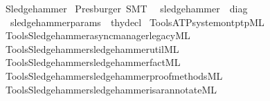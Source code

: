 %
\begin{isabellebody}%
%
%
\isadelimdocument
%
\endisadelimdocument
%
\isatagdocument
%
\isamarkuptrue%
%
\endisatagdocument
{\isafolddocument}%
%
\isadelimdocument
%
\endisadelimdocument
%
\isadelimtheory
%
\endisadelimtheory
%
\isatagtheory
{}\isamarkupfalse%
\ Sledgehammer\isanewline
{}\ Presburger\ SMT\isanewline
{}\isanewline
\ \ {\isachardoublequoteopen}sledgehammer{\isachardoublequoteclose}\ {\isacharcolon}{\kern0pt}{\isacharcolon}{\kern0pt}\ diag\ \isanewline
\ \ {\isachardoublequoteopen}sledgehammer{\isacharunderscore}{\kern0pt}params{\isachardoublequoteclose}\ {\isacharcolon}{\kern0pt}{\isacharcolon}{\kern0pt}\ thy{\isacharunderscore}{\kern0pt}decl\isanewline
{}%
\endisatagtheory
{\isafoldtheory}%
%
\isadelimtheory
\isanewline
%
\endisadelimtheory
%
\isadelimML
\isanewline
%
\endisadelimML
%
\isatagML
{}\isamarkupfalse%
\ {\isacartoucheopen}Tools{\isacharslash}{\kern0pt}ATP{\isacharslash}{\kern0pt}system{\isacharunderscore}{\kern0pt}on{\isacharunderscore}{\kern0pt}tptp{\isachardot}{\kern0pt}ML{\isacartoucheclose}\isanewline
{}\isamarkupfalse%
\ {\isacartoucheopen}Tools{\isacharslash}{\kern0pt}Sledgehammer{\isacharslash}{\kern0pt}async{\isacharunderscore}{\kern0pt}manager{\isacharunderscore}{\kern0pt}legacy{\isachardot}{\kern0pt}ML{\isacartoucheclose}\isanewline
{}\isamarkupfalse%
\ {\isacartoucheopen}Tools{\isacharslash}{\kern0pt}Sledgehammer{\isacharslash}{\kern0pt}sledgehammer{\isacharunderscore}{\kern0pt}util{\isachardot}{\kern0pt}ML{\isacartoucheclose}\isanewline
{}\isamarkupfalse%
\ {\isacartoucheopen}Tools{\isacharslash}{\kern0pt}Sledgehammer{\isacharslash}{\kern0pt}sledgehammer{\isacharunderscore}{\kern0pt}fact{\isachardot}{\kern0pt}ML{\isacartoucheclose}\isanewline
{}\isamarkupfalse%
\ {\isacartoucheopen}Tools{\isacharslash}{\kern0pt}Sledgehammer{\isacharslash}{\kern0pt}sledgehammer{\isacharunderscore}{\kern0pt}proof{\isacharunderscore}{\kern0pt}methods{\isachardot}{\kern0pt}ML{\isacartoucheclose}\isanewline
{}\isamarkupfalse%
\ {\isacartoucheopen}Tools{\isacharslash}{\kern0pt}Sledgehammer{\isacharslash}{\kern0pt}sledgehammer{\isacharunderscore}{\kern0pt}isar{\isacharunderscore}{\kern0pt}annotate{\isachardot}{\kern0pt}ML{\isacartoucheclose}\isanewline

\end{isabellebody}
